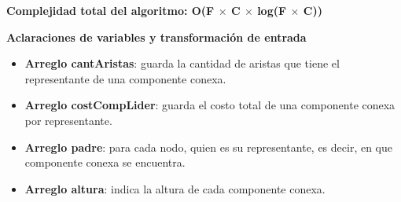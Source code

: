 \textbf{Complejidad total del algoritmo: O(F $\times$ C $\times$ log(F $\times$ C))}

\textbf{Aclaraciones de variables y transformaci\'on de entrada}

\begin{itemize}

\item {\bf Arreglo cantAristas}: guarda la cantidad de aristas que tiene el representante de una componente conexa.
\item {\bf Arreglo costCompLider}: guarda el costo total de una componente conexa por representante. 
\item {\bf Arreglo padre}: para cada nodo, quien es su representante, es decir, en que componente conexa se encuentra.
\item {\bf Arreglo altura}: indica la altura de cada componente conexa.
\end{itemize}  
